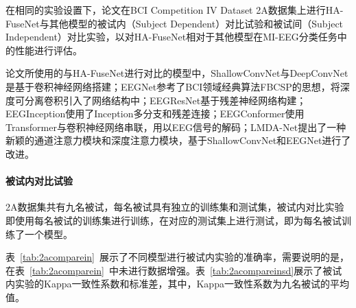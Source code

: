 在相同的实验设置下，论文在BCI Competition IV Dataset 2A数据集上进行HA-FuseNet与其他模型的被试内（Subject Dependent）对比试验和被试间（Subject Independent）对比实验，以对HA-FuseNet相对于其他模型在MI-EEG分类任务中的性能进行评估。

论文所使用的与HA-FuseNet进行对比的模型中，ShallowConvNet\cite{schirrmeister2017deep}与DeepConvNet\cite{schirrmeister2017deep}是基于卷积神经网络搭建；EEGNet\cite{lawhern2018eegnet}参考了BCI领域经典算法FBCSP的思想，将深度可分离卷积引入了网络结构中；EEGResNet\cite{HBM:HBM23730}基于残差神经网络\cite{he2016deep}构建；EEGInception\cite{zhang2021eeg}使用了Inception多分支和残差连接；EEGConformer\cite{song2022eeg}使用Transformer\cite{vaswani2017attention}与卷积神经网络串联，用以EEG信号的解码；LMDA-Net\cite{miao2023lmda}提出了一种新颖的通道注意力模块和深度注意力模块，基于ShallowConvNet和EEGNet进行了改进。

\paragraph{被试内对比试验}

2A数据集共有九名被试，每名被试具有独立的训练集和测试集，被试内对比实验即使用每名被试的训练集进行训练，在对应的测试集上进行测试，即为每名被试训练了一个模型。

表~\ref{tab:2acomparein}~展示了不同模型进行被试内实验的准确率，需要说明的是，在表~\ref{tab:2acomparein}~中未进行数据增强。表~\ref{tab:2acompareinsd}展示了被试内实验的Kappa一致性系数和标准差，其中，Kappa一致性系数为九名被试的平均值。

